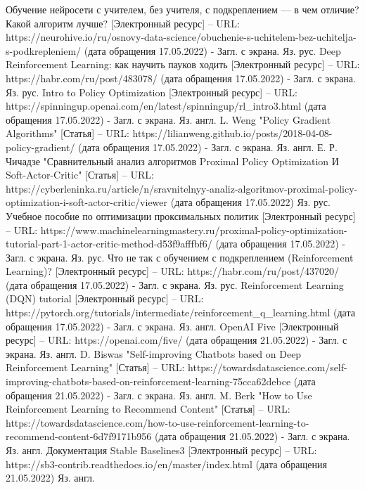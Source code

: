 \documentclass[bachelor, och, coursework]{shiza}
\begin{document}
\begin{thebibliography}{3}
    Обучение нейросети с учителем, без учителя, с подкреплением — в чем отличие? Какой алгоритм лучше? [Электронный ресурс] – URL: https://neurohive.io/ru/osnovy-data-science/obuchenie-s-uchitelem-bez-uchitelja-s-podkrepleniem/ (дата обращения 17.05.2022) - Загл. с экрана. Яз. рус.
    Deep Reinforcement Learning: как научить пауков ходить [Электронный ресурс] – URL: https://habr.com/ru/post/483078/ (дата обращения 17.05.2022) - Загл. с экрана. Яз. рус.
    Intro to Policy Optimization [Электронный ресурс] – URL: https://spinningup.openai.com/en/latest/spinningup/rl_intro3.html (дата обращения 17.05.2022) - Загл. с экрана. Яз. англ.
    L. Weng "Policy Gradient Algorithms" [Статья] – URL: https://lilianweng.github.io/posts/2018-04-08-policy-gradient/ (дата обращения 17.05.2022) - Загл. с экрана. Яз. англ.
    Е. Р. Чичадзе "Сравнительный анализ алгоритмов Proximal Policy Optimization И Soft-Actor-Critic" [Статья] – URL: https://cyberleninka.ru/article/n/sravnitelnyy-analiz-algoritmov-proximal-policy-optimization-i-soft-actor-critic/viewer (дата обращения 17.05.2022) Яз. рус.
    Учебное пособие по оптимизации проксимальных политик [Электронный ресурс] – URL: https://www.machinelearningmastery.ru/proximal-policy-optimization-tutorial-part-1-actor-critic-method-d53f9afffbf6/ (дата обращения 17.05.2022) - Загл. с экрана. Яз. рус.
    Что не так с обучением с подкреплением (Reinforcement Learning)? [Электронный ресурс] – URL: https://habr.com/ru/post/437020/ (дата обращения 17.05.2022) - Загл. с экрана. Яз. рус.
    Reinforcement Learning (DQN) tutorial [Электронный ресурс] – URL: https://pytorch.org/tutorials/intermediate/reinforcement_q_learning.html (дата обращения 17.05.2022) - Загл. с экрана. Яз. англ.
    OpenAI Five [Электронный ресурс] – URL: https://openai.com/five/ (дата обращения 21.05.2022) - Загл. с экрана. Яз. англ.
    D. Biswas "Self-improving Chatbots based on Deep Reinforcement Learning" [Статья] – URL: https://towardsdatascience.com/self-improving-chatbots-based-on-reinforcement-learning-75cca62debce (дата обращения 21.05.2022) - Загл. с экрана. Яз. англ.
    M. Berk "How to Use Reinforcement Learning to Recommend Content" [Статья] – URL: https://towardsdatascience.com/how-to-use-reinforcement-learning-to-recommend-content-6d7f9171b956 (дата обращения 21.05.2022) - Загл. с экрана. Яз. англ.
    Документация Stable Baselines3 [Электронный ресурс] – URL: https://sb3-contrib.readthedocs.io/en/master/index.html (дата обращения 21.05.2022) Яз. англ.

\end{thebibliography}
\end{document}
